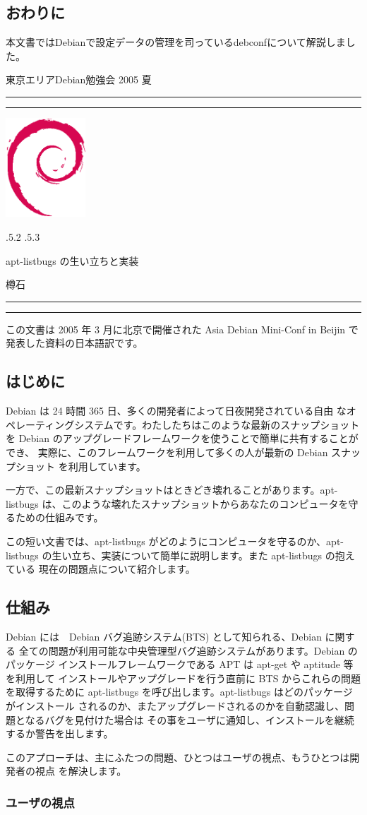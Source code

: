 \documentclass[mingoth,a4paper]{jsarticle}
\makeatletter
\renewcommand{\section}{\@startsection{section}{1}{\z@}%
    {\Cvs \@plus.5\Cdp \@minus.2\Cdp}%
    {.5\Cvs \@plus.3\Cdp}%
    {\normalfont\Large\headfont\raggedright\centering}} %
\newcommand{\dancersection}[2]{%
\newpage
東京エリアDebian勉強会 2005 夏
\hrule
\vspace{0.5mm}
\hrule
\hfill{}\includegraphics[width=3cm]{image200502/openlogo-nd.eps}\\
\vspace{-4cm}
\begin{center}
  \section{#1}
\end{center}
\hfill{}#2\hspace{3cm}\space\\
\hrule
\hrule
\vspace{1cm}
}
\makeatother
\begin{document}
\subsection{おわりに}

本文書ではDebianで設定データの管理を司っているdebconfについて解説しました。

\dancersection{apt-listbugs の生い立ちと実装}{樽石}
\label{sec:taruishi}
この文書は 2005 年 3 月に北京で開催された Asia Debian Mini-Conf
in Beijin で発表した資料の日本語訳です。

\subsection{はじめに}


Debian は 24 時間 365 日、多くの開発者によって日夜開発されている自由
なオペレーティングシステムです。わたしたちはこのような最新のスナップショットを
Debian のアップグレードフレームワークを使うことで簡単に共有することができ、
実際に、このフレームワークを利用して多くの人が最新の Debian スナップショット
を利用しています。

一方で、この最新スナップショットはときどき壊れることがあります。apt-listbugs
は、このような壊れたスナップショットからあなたのコンピュータを守るための仕組みです。

この短い文書では、apt-listbugs がどのようにコンピュータを守るのか、apt-listbugs
の生い立ち、実装について簡単に説明します。また apt-listbugs の抱えている
現在の問題点について紹介します。

\subsection{仕組み}

Debian には　Debian バグ追跡システム(BTS) として知られる、Debian に関する
全ての問題が利用可能な中央管理型バグ追跡システムがあります。Debian のパッケージ
インストールフレームワークである APT は apt-get や aptitude 等を利用して
インストールやアップグレードを行う直前に BTS からこれらの問題を取得するために
apt-listbugs を呼び出します。apt-listbugs はどのパッケージがインストール
されるのか、またアップグレードされるのかを自動認識し、問題となるバグを見付けた場合は
その事をユーザに通知し、インストールを継続するか警告を出します。

このアプローチは、主にふたつの問題、ひとつはユーザの視点、もうひとつは開発者の視点
を解決します。

\subsubsection{ユーザの視点}
\end{document}
